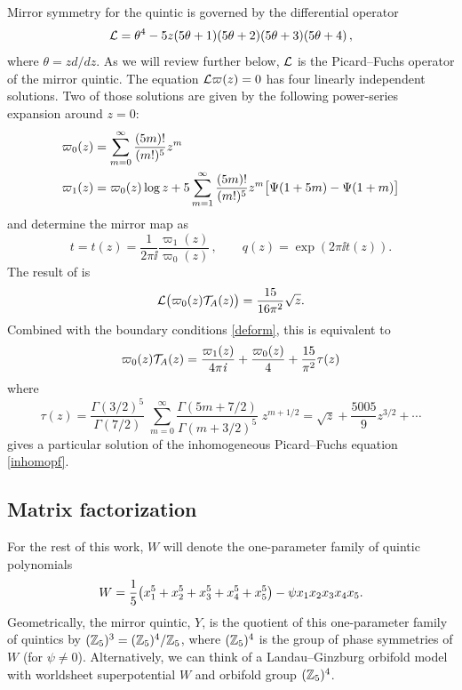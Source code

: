 Mirror symmetry for the quintic is governed by the differential operator
\begin{equation}
\eqlabel{pfop}
\call= \theta^4 - 5z (5\theta+1)(5\theta+2)(5\theta+3)(5\theta+4)\,,
\end{equation}
where $\theta = z d/dz$. As we will review further below, ${\cal L}$ is the 
Picard--Fuchs operator of the mirror quintic. The equation ${\cal L}\varpi(z)=0$
has four linearly independent solutions. Two of those solutions are
given by the following power-series expansion around $z=0$:
\begin{equation}
\eqlabel{fundamental}
\begin{split}
\varpi_0(z) &= \sum_{m=0}^\infty \frac{(5m)!}{(m!)^5} z^m \\
\varpi_1(z) &= \varpi_0(z) \log z + 5 \sum_{m=1}^\infty
\frac{(5m)!}{(m!)^5} z^m\bigl[\Psi(1+5m)-\Psi(1+m)\bigr] \\
\end{split}
\end{equation}
and determine the mirror map as
\begin{equation}
t = t(z) = \frac{1}{2\pi\ii} \frac{\varpi_1(z)}{\varpi_0(z)}\,,\qquad 
q(z) = \exp(2\pi\ii t(z)) .
\end{equation}
The result of \cite{open,psw} is
\begin{equation}
\eqlabel{inhomopf}
\call \bigl(\varpi_0(z)\calt_A(z)\bigr) = \frac{15}{16\pi^2} \sqrt{z} .
\end{equation}
Combined with the boundary conditions \eqref{deform}, this is equivalent to
\begin{equation}
\eqlabel{lvasym}
\varpi_0(z)\calt_A(z) = \frac{\varpi_1(z)}{4\pi\ii}+ \frac{\varpi_0(z)}{4} + 
\frac{15}{\pi^2}\tau(z)
\end{equation}
where
\begin{equation}
\tau(z) = \frac{\Gamma(3/2)^5}{\Gamma(7/2)}\;
\sum_{m=0}^\infty \frac{\Gamma(5m+7/2)}{\Gamma(m+3/2)^5}\; z^{m+1/2}
= \sqrt{z} + \frac{5005}{9} z^{3/2} + \cdots 
\end{equation}
gives a particular solution of the inhomogeneous Picard--Fuchs equation
\eqref{inhomopf}.


\subsection{Matrix factorization}

For the rest of this work, $W$ will denote the one-parameter family of 
quintic polynomials
\begin{equation}
\eqlabel{onepar}
W = \frac 15\bigl(x_1^5+x_2^5+x_3^5+x_4^5+x_5^5\bigr) -\psi x_1x_2x_3x_4x_5 .
\end{equation}
Geometrically, the mirror quintic, $Y$, is the quotient of this one-parameter 
family of quintics by $({\mathbb Z}_5)^3=({\mathbb Z}_5)^4/{\mathbb Z}_5$, where $({\mathbb Z}_5)^4$ is
the group of phase symmetries of $W$ (for $\psi\neq 0$). Alternatively, we 
can think of a Landau--Ginzburg orbifold model with worldsheet superpotential
$W$ and orbifold group $({\mathbb Z}_5)^4$. 

